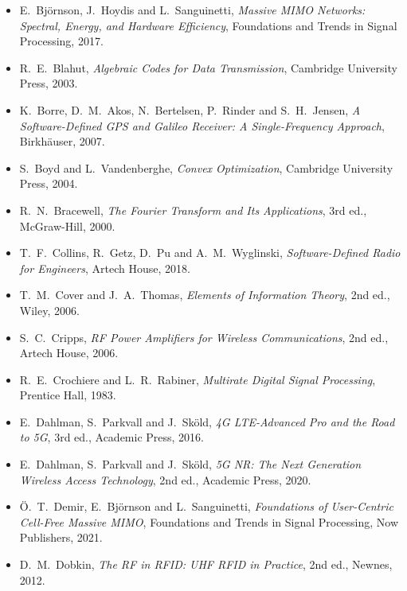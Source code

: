 \begin{itemize}[leftmargin=1.5em,itemindent=-1.5em,itemsep=1.5pt plus 1pt,parsep=0pt,topsep=4pt,label={}]
\item E.~Bj\"ornson, J.~Hoydis and L.~Sanguinetti, \emph{Massive MIMO Networks: Spectral, Energy, and Hardware Efficiency}, Foundations and Trends in Signal Processing, 2017.
\item R.~E.~Blahut, \emph{Algebraic Codes for Data Transmission}, Cambridge University Press, 2003.
\item K.~Borre, D.~M.~Akos, N.~Bertelsen, P.~Rinder and S.~H.~Jensen, \emph{A Software-Defined GPS and Galileo Receiver: A Single-Frequency Approach}, Birkh\"auser, 2007.
\item S.~Boyd and L.~Vandenberghe, \emph{Convex Optimization}, Cambridge University Press, 2004.
\item R.~N.~Bracewell, \emph{The Fourier Transform and Its Applications}, 3rd ed., McGraw-Hill, 2000.
\item T.~F.~Collins, R.~Getz, D.~Pu and A.~M.~Wyglinski, \emph{Software-Defined Radio for Engineers}, Artech House, 2018.
\item T.~M.~Cover and J.~A.~Thomas, \emph{Elements of Information Theory}, 2nd ed., Wiley, 2006.
\item S.~C.~Cripps, \emph{RF Power Amplifiers for Wireless Communications}, 2nd ed., Artech House, 2006.
\item R.~E.~Crochiere and L.~R.~Rabiner, \emph{Multirate Digital Signal Processing}, Prentice Hall, 1983.
\item E.~Dahlman, S.~Parkvall and J.~Sk\"old, \emph{4G LTE-Advanced Pro and the Road to 5G}, 3rd ed., Academic Press, 2016.
\item E.~Dahlman, S.~Parkvall and J.~Sk\"old, \emph{5G NR: The Next Generation Wireless Access Technology}, 2nd ed., Academic Press, 2020.
\item \"O.~T.~Demir, E.~Bj\"ornson and L.~Sanguinetti, \emph{Foundations of User-Centric Cell-Free Massive MIMO}, Foundations and Trends in Signal Processing, Now Publishers, 2021.
\item D.~M.~Dobkin, \emph{The RF in RFID: UHF RFID in Practice}, 2nd ed., Newnes, 2012.

\end{itemize}

